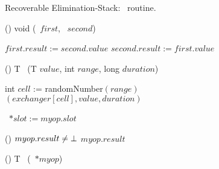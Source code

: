\begin{figure*}[!t]
\begin{algorithm}[H]
	\caption{Recoverable Elimination-Stack: \exchange\ routine.}
	\label{alg:eliminition-stack-exchange}
	\end{algorithm}

\end{figure*}




\begin{figure*}[!t]
	\removelatexerror
	
	\begin{algorithm}[H]
		
	\small
	\begin{flushleft}	
	\end{flushleft}
	
	\begin{procedure}[H]
		\caption{() void \switchPair (\exInfo\ $first$, \exInfo\ $second$)}
		
		$first.result := second.value$ \;
		$second.result := first.value$ \;
		
	\end{procedure}
	
	\begin{procedure}[H]
		\caption{() T \visit\ (T $value$, int $range$, long $duration$)}
		
		int $cell$ := randomNumber$(range)$ \;
		\KwRet \exchange$(exchanger[cell], value, duration)$
	\end{procedure}
	
	\begin{procedure}[H]
		\caption{() T \recoverExchange\ (\exInfo\ $*myop$)}
		
		\exInfo\ $*slot := myop.slot$ 
		
		\uIf () {$myop.result \neq \mbox{$\bot$}$}
		{\KwRet $myop.result$}
		

\end{procedure}
\end{algorithm}
\end{figure*}
